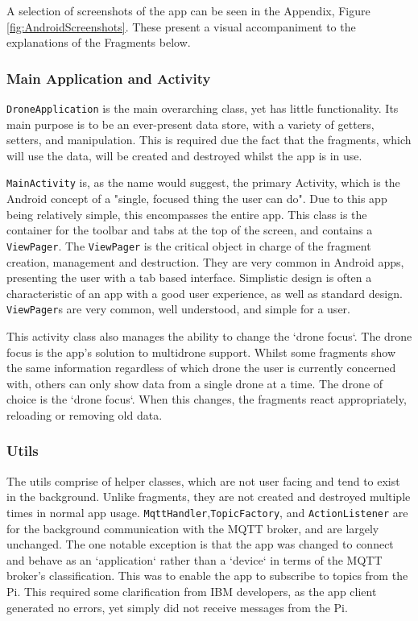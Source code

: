 \documentclass{article}
\begin{document}
A selection of screenshots of the app can be seen in the Appendix, Figure \ref{fig:AndroidScreenshots}. These present a visual accompaniment to the explanations of the Fragments below. 

\subsubsection{Main Application and Activity}
\texttt{DroneApplication} is the main overarching class, yet has little functionality. Its main purpose is to be an ever-present data store, with a variety of getters, setters, and manipulation. This is required due the fact that the fragments, which will use the data, will be created and destroyed whilst the app is in use. 

\texttt{MainActivity} is, as the name would suggest, the primary Activity, which is the Android concept of a "single, focused thing the user can do"\cite{androidActivity}. Due to this app being relatively simple, this encompasses the entire app. This class is the container for the toolbar and tabs at the top of the screen, and contains a \texttt{ViewPager}. The \texttt{ViewPager} is the critical object in charge of the fragment creation, management and destruction. They are very common in Android apps, presenting the user with a tab based interface. Simplistic design is often a characteristic of an app with a good user experience, as well as standard design. \texttt{ViewPager}s are very common, well understood, and simple for a user. 

This activity class also manages the ability to change the `drone focus`. The drone focus is the app's solution to multidrone support. Whilst some fragments show the same information regardless of which drone the user is currently concerned with, others can only show data from a single drone at a time. The drone of choice is the `drone focus`. When this changes, the fragments react appropriately, reloading or removing old data. 

\subsubsection{Utils}
The utils comprise of helper classes, which are not user facing and tend to exist in the background. Unlike fragments, they are not created and destroyed multiple times in normal app usage. \texttt{MqttHandler},\texttt{TopicFactory}, and \texttt{ActionListener} are for the background communication with the MQTT broker, and are largely unchanged. The one notable exception is that the app was changed to connect and behave as an `application` rather than a `device` in terms of the MQTT broker's classification. This was to enable the app to subscribe to topics from the Pi. This required some clarification from IBM developers, as the app client generated no errors, yet simply did not receive messages from the Pi\cite{githubTopicIssue}.
\end{document}
